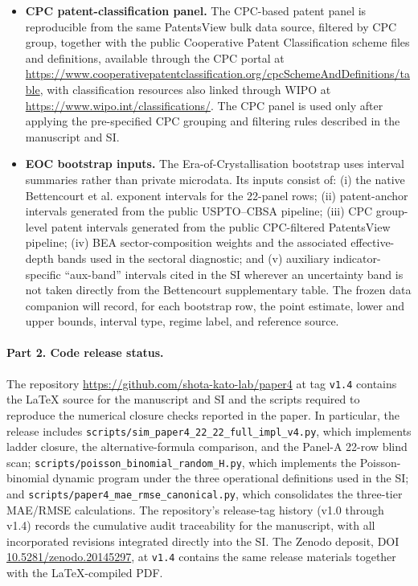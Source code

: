 \begin{itemize}
    \item \textbf{CPC patent-classification panel.} The CPC-based patent panel is reproducible from the same PatentsView bulk data source, filtered by CPC group, together with the public Cooperative Patent Classification scheme files and definitions, available through the CPC portal at \url{https://www.cooperativepatentclassification.org/cpcSchemeAndDefinitions/table}, with classification resources also linked through WIPO at \url{https://www.wipo.int/classifications/}. The CPC panel is used only after applying the pre-specified CPC grouping and filtering rules described in the manuscript and SI.

    \item \textbf{EOC bootstrap inputs.} The Era-of-Crystallisation bootstrap uses interval summaries rather than private microdata. Its inputs consist of: (i) the native Bettencourt et al. exponent intervals for the 22-panel rows; (ii) patent-anchor intervals generated from the public USPTO--CBSA pipeline; (iii) CPC group-level patent intervals generated from the public CPC-filtered PatentsView pipeline; (iv) BEA sector-composition weights and the associated effective-depth bands used in the sectoral diagnostic; and (v) auxiliary indicator-specific ``aux-band'' intervals cited in the SI wherever an uncertainty band is not taken directly from the Bettencourt supplementary table. The frozen data companion will record, for each bootstrap row, the point estimate, lower and upper bounds, interval type, regime label, and reference source.
\end{itemize}

\paragraph{Part 2. Code release status.}
The repository \url{https://github.com/shota-kato-lab/paper4} at tag \texttt{v1.4} contains the LaTeX source for the manuscript and SI and the scripts required to reproduce the numerical closure checks reported in the paper. In particular, the release includes \texttt{scripts/sim\_paper4\_22\_22\_full\_impl\_v4.py}, which implements ladder closure, the alternative-formula comparison, and the Panel-A 22-row blind scan; \texttt{scripts/poisson\_binomial\_random\_H.py}, which implements the Poisson-binomial dynamic program under the three operational definitions used in the SI; and \texttt{scripts/paper4\_mae\_rmse\_canonical.py}, which consolidates the three-tier MAE/RMSE calculations. The repository's release-tag history (v1.0 through v1.4) records the cumulative audit traceability for the manuscript, with all incorporated revisions integrated directly into the SI. The Zenodo deposit, DOI \href{https://doi.org/10.5281/zenodo.20145297}{10.5281/zenodo.20145297}, at \texttt{v1.4} contains the same release materials together with the LaTeX-compiled PDF.

